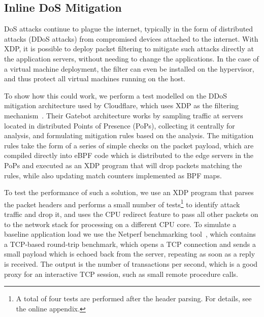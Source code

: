 \documentclass[10pt,sigconf,anonymous]{acmart}
\begin{document}

\subsection{Inline DoS Mitigation}
\label{sec:dos-usecase}
DoS attacks continue to plague the internet, typically in the form of
distributed attacks (DDoS attacks) from compromised devices attached to the
internet. With XDP, it is possible to deploy packet filtering to mitigate such
attacks directly at the application servers, without needing to change the
applications. In the case of a virtual machine deployment, the filter can even
be installed on the hypervisor, and thus protect all virtual machines running on
the host.

To show how this could work, we perform a test modelled on the DDoS mitigation
architecture used by Cloudflare, which uses XDP as the filtering
mechanism~\cite{cloudflare-ddos}. Their Gatebot architecture works by sampling
traffic at servers located in distributed Points of Presence (PoPs), collecting
it centrally for analysis, and formulating mitigation rules based on the
analysis. The mitigation rules take the form of a series of simple checks on the
packet payload, which are compiled directly into eBPF code which is distributed
to the edge servers in the PoPs and executed as an XDP program that will drop
packets matching the rules, while also updating match counters implemented as
BPF maps.

To test the performance of such a solution, we use an XDP program that parses
the packet headers and performs a small number of tests\footnote{A total of four
  tests are performed after the header parsing. For details, see the online
  appendix.} to identify attack traffic and drop it, and uses the CPU redirect
feature to pass all other packets on to the network stack for processing on a
different CPU core. To simulate a baseline application load we use the Netperf
benchmarking tool~\cite{netperf}, which contains a TCP-based round-trip
benchmark, which opens a TCP connection and sends a small payload which is
echoed back from the server, repeating as soon as a reply is received. The
output is the number of transactions per second, which is a good proxy for an
interactive TCP session, such as small remote procedure calls.
\end{document}
